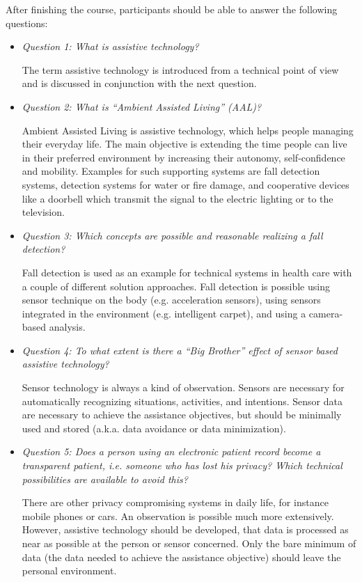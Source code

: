 \documentclass[runningheads,a4paper]{llncs}
\begin{document}
After finishing the course, participants should be able to answer the following questions:

\begin{itemize}

\item \emph{Question 1: What is assistive technology?}

The term assistive technology is introduced from a technical point of view and is discussed in conjunction with the next question.

\item \emph{Question 2: What is ``Ambient Assisted Living'' (AAL)?}

Ambient Assisted Living is assistive technology, which helps people managing their everyday life. The main objective is extending the time people can live in their preferred environment by increasing their autonomy, self-confidence and mobility.
Examples for such supporting systems are fall detection systems, detection systems for water or fire damage, and cooperative devices like a doorbell which transmit the signal to the electric lighting or to the television.

\item \emph{Question 3: Which concepts are possible and reasonable realizing a fall detection?}

Fall detection is used as an example for technical systems in health care with a couple of different solution approaches. Fall detection is possible using sensor technique on the body (e.g. acceleration sensors), using sensors integrated in the environment (e.g. intelligent carpet), and using a camera-based analysis.

\item \emph{Question 4: To what extent is there a “Big Brother” effect of sensor based assistive technology?}

Sensor technology is always a kind of observation. Sensors are necessary for automatically recognizing situations, activities, and intentions.
Sensor data are necessary to achieve the assistance objectives, but should be minimally used and stored (a.k.a. data avoidance or data minimization).

\item \emph{Question 5: Does a person using an electronic patient record become a transparent patient, i.e. someone who has lost his privacy? Which technical possibilities are available to avoid this?}

There are other privacy compromising systems in daily life, for instance mobile phones or cars. An observation is possible much more extensively. However, assistive technology should be developed, that data is processed as near as possible at the person or sensor concerned. Only the bare minimum of data (the data needed to achieve the assistance objective) should leave the personal environment.
\end{itemize}
\end{document}
